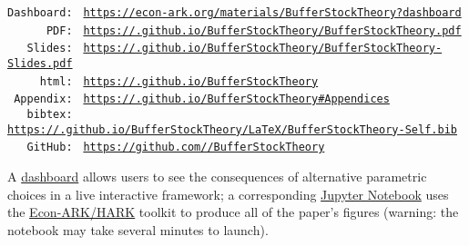 \documentclass[BufferStockTheory]{subfiles}
\begin{document}
\hypertarget{links}{}
\begin{footnotesize}
  \parbox{\textwidth}{
    \begin{center}
      \begin{tabbing}
        \texttt{Dashboard:~} \= \= \texttt{\href{https://econ-ark.org/materials/BufferStockTheory?dashboard}{https://econ-ark.org/materials/BufferStockTheory?dashboard}} \\
        \texttt{~~~~~~PDF:~} \> \> \texttt{\href{https://\owner.github.io/BufferStockTheory/BufferStockTheory.pdf}{https://\owner.github.io/BufferStockTheory/BufferStockTheory.pdf}} \\ %
        \texttt{~~~Slides:~} \> \> \texttt{\href{https://\owner.github.io/BufferStockTheory/BufferStockTheory-Slides.pdf}{https://\owner.github.io/BufferStockTheory/BufferStockTheory-Slides.pdf}} \\
        \texttt{~~~~~html:~} \> \> \texttt{\href{https://\owner.github.io/BufferStockTheory}{https://\owner.github.io/BufferStockTheory}}    \\
        \texttt{~Appendix:~} \> \> \texttt{\href{https://\owner.github.io/BufferStockTheory\#Appendices}{https://\owner.github.io/BufferStockTheory\#Appendices}}    \\
        \texttt{~~~bibtex:~} \> \> \texttt{\href{https://\owner.github.io/BufferStockTheory/LaTeX/BufferStockTheory-Self.bib}{https://\owner.github.io/BufferStockTheory/LaTeX/BufferStockTheory-Self.bib}}  \\
        \texttt{~~~GitHub:~} \> \> \texttt{\href{https://github.com/\owner/BufferStockTheory}{https://github.com/\owner/BufferStockTheory}} \\
      \end{tabbing}
    \end{center}
    
    A \href{https://econ-ark.org/materials/BufferStockTheory?dashboard}{dashboard} allows users to see the consequences of alternative parametric choices in a live interactive framework; a corresponding \href{https://https://econ-ark.org/materials/BufferStockTheory?launch}{Jupyter Notebook}  uses the \href{https://econ-ark/HARK}{Econ-ARK/HARK} toolkit to produce all of the paper's figures (warning: the notebook may take several minutes to launch).
  } %
\end{footnotesize}

\begin{authorsinfo}
\end{authorsinfo}
\end{document}
